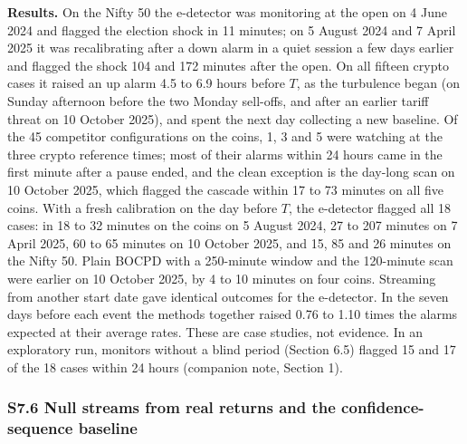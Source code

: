 \documentclass[
]{article}
\begin{document}
\textbf{Results.} On the Nifty 50 the e-detector was monitoring at the
open on 4 June 2024 and flagged the election shock in 11 minutes; on 5
August 2024 and 7 April 2025 it was recalibrating after a down alarm in
a quiet session a few days earlier and flagged the shock 104 and 172
minutes after the open. On all fifteen crypto cases it raised an up
alarm 4.5 to 6.9 hours before \(T\), as the turbulence began (on Sunday
afternoon before the two Monday sell-offs, and after an earlier tariff
threat on 10 October 2025), and spent the next day collecting a new
baseline. Of the 45 competitor configurations on the coins, 1, 3 and 5
were watching at the three crypto reference times; most of their alarms
within 24 hours came in the first minute after a pause ended, and the
clean exception is the day-long scan on 10 October 2025, which flagged
the cascade within 17 to 73 minutes on all five coins. With a fresh
calibration on the day before \(T\), the e-detector flagged all 18
cases: in 18 to 32 minutes on the coins on 5 August 2024, 27 to 207
minutes on 7 April 2025, 60 to 65 minutes on 10 October 2025, and 15, 85
and 26 minutes on the Nifty 50. Plain BOCPD with a 250-minute window and
the 120-minute scan were earlier on 10 October 2025, by 4 to 10 minutes
on four coins. Streaming from another start date gave identical outcomes
for the e-detector. In the seven days before each event the methods
together raised 0.76 to 1.10 times the alarms expected at their average
rates. These are case studies, not evidence. In an exploratory run,
monitors without a blind period (Section 6.5) flagged 15 and 17 of the
18 cases within 24 hours (companion note, Section 1).

\hypertarget{s7.6-null-streams-from-real-returns-and-the-confidence-sequence-baseline}{%
\subsubsection{S7.6 Null streams from real returns and the
confidence-sequence
baseline}\label{s7.6-null-streams-from-real-returns-and-the-confidence-sequence-baseline}}
\end{document}
